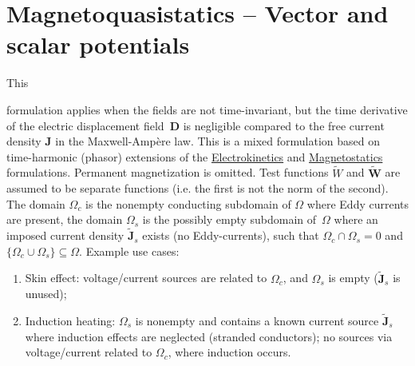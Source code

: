 \documentclass[letterpaper]{article}
\newcommand{\vect}[1]{\mathbf#1}
\newcommand{\vecp}[1]{\tilde{\mathbf#1}}
\begin{document}
\section{Magnetoquasistatics -- Vector and scalar potentials}
\label{sec_mqs}

\hypertarget{sec_mqs}{This} formulation applies when the fields are not time-invariant, but the time derivative of the electric displacement field~$\vect{D}$ is negligible compared to the free current density $\vect{J}$ in the Maxwell-Ampère law. This is a mixed formulation based on time-harmonic (phasor) extensions of the \hyperlink{sec_ksp}{Electrokinetics} and \hyperlink{sec_mvp}{Magnetostatics} formulations. Permanent magnetization is omitted. Test functions $\tilde{W}$ and $\vecp{W}$ are assumed to be separate functions (i.e. the first is not the norm of the second). 
The domain $\Omega_c$ is the nonempty conducting subdomain of $\Omega$ where Eddy currents are present, the domain $\Omega_s$ is the possibly empty subdomain of~$\Omega$ where an imposed current density $\vecp{J}_s$ exists (no Eddy-currents), %
such that $\Omega_c \cap \Omega_s=0$ and $\{\Omega_c \cup \Omega_s\} \subseteq\Omega$. Example use cases:
\begin{enumerate}
\item Skin effect: voltage/current sources are related to $\Omega_c$, and $\Omega_s$ is empty ($\vecp{J}_s$ is unused);
\item Induction heating: $\Omega_s$ is nonempty and contains a known current source $\vecp{J}_s$ where induction effects are neglected (stranded conductors); no sources via voltage/current related to $\Omega_c$, where induction occurs.
\end{enumerate}
\end{document}
